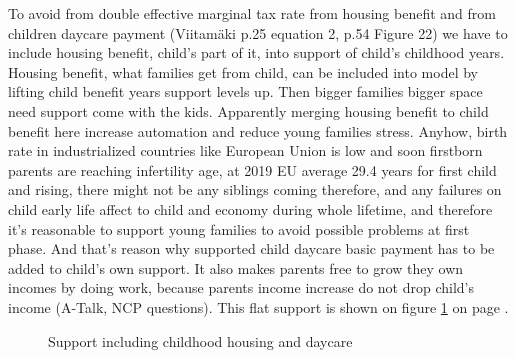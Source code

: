 To avoid from double effective marginal tax rate
from housing benefit and from children daycare payment
(Viitam\"aki\cite{VM_46_2019} p.25 equation 2, p.54 Figure 22)
we have to include housing benefit, child's part of it,
into support of child's childhood years.
Housing benefit, what families get from child,
can be included into model by lifting child benefit years support levels up.
Then bigger families bigger space need support come with the kids.
Apparently merging housing benefit to child benefit here increase automation and reduce young families stress.
Anyhow, birth rate in industrialized countries like European Union is low and soon firstborn parents are reaching infertility age,
at 2019 EU average 29.4 years for first child and rising, there might not be any siblings coming therefore,
and any failures on child early life affect to child and economy during whole lifetime,
and therefore it's reasonable to support young families to avoid possible problems at first phase.
And that's reason why supported child daycare basic payment has to be added to child's own support.
It also makes parents free to grow they own incomes by doing work,
because parents income increase do not drop child's income
(A-Talk\cite{ATalk230413213839}, NCP questions\cite{NCPquestions}).
This flat support is shown on figure \ref{fig:EvenSu} on page \pageref{fig:EvenSu}.
\begin{figure} %
 \begin{center}
  \caption{Support including childhood housing and daycare}
  \label{fig:EvenSu}  
 \end{center}
\end{figure}

